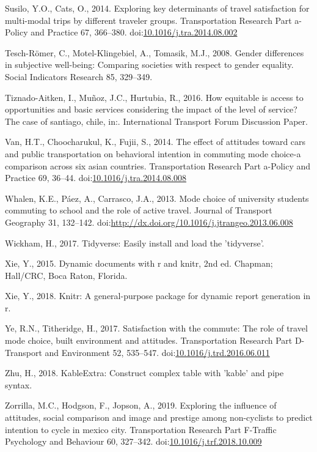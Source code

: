 \documentclass[]{elsarticle} %
\begin{document}
\leavevmode\hypertarget{ref-Susilo2014exploring}{}%
Susilo, Y.O., Cats, O., 2014. Exploring key determinants of travel
satisfaction for multi-modal trips by different traveler groups.
Transportation Research Part a-Policy and Practice 67, 366--380.
doi:\href{https://doi.org/10.1016/j.tra.2014.08.002}{10.1016/j.tra.2014.08.002}

\leavevmode\hypertarget{ref-Tesch2008gender}{}%
Tesch-Römer, C., Motel-Klingebiel, A., Tomasik, M.J., 2008. Gender
differences in subjective well-being: Comparing societies with respect
to gender equality. Social Indicators Research 85, 329--349.

\leavevmode\hypertarget{ref-TiznadoAitken2016}{}%
Tiznado-Aitken, I., Muñoz, J.C., Hurtubia, R., 2016. How equitable is
access to opportunities and basic services considering the impact of the
level of service? The case of santiago, chile, in:. International
Transport Forum Discussion Paper.

\leavevmode\hypertarget{ref-Van2014effect}{}%
Van, H.T., Choocharukul, K., Fujii, S., 2014. The effect of attitudes
toward cars and public transportation on behavioral intention in
commuting mode choice-a comparison across six asian countries.
Transportation Research Part a-Policy and Practice 69, 36--44.
doi:\href{https://doi.org/10.1016/j.tra.2014.08.008}{10.1016/j.tra.2014.08.008}

\leavevmode\hypertarget{ref-Whalen2013mode}{}%
Whalen, K.E., Páez, A., Carrasco, J.A., 2013. Mode choice of university
students commuting to school and the role of active travel. Journal of
Transport Geography 31, 132--142.
doi:\href{https://doi.org/http://dx.doi.org/10.1016/j.jtrangeo.2013.06.008}{http://dx.doi.org/10.1016/j.jtrangeo.2013.06.008}

\leavevmode\hypertarget{ref-Wickham2017}{}%
Wickham, H., 2017. Tidyverse: Easily install and load the 'tidyverse'.

\leavevmode\hypertarget{ref-Xie2015}{}%
Xie, Y., 2015. Dynamic documents with r and knitr, 2nd ed. Chapman;
Hall/CRC, Boca Raton, Florida.

\leavevmode\hypertarget{ref-Xie2018}{}%
Xie, Y., 2018. Knitr: A general-purpose package for dynamic report
generation in r.

\leavevmode\hypertarget{ref-Ye2017satisfaction}{}%
Ye, R.N., Titheridge, H., 2017. Satisfaction with the commute: The role
of travel mode choice, built environment and attitudes. Transportation
Research Part D-Transport and Environment 52, 535--547.
doi:\href{https://doi.org/10.1016/j.trd.2016.06.011}{10.1016/j.trd.2016.06.011}

\leavevmode\hypertarget{ref-Zhu2018}{}%
Zhu, H., 2018. KableExtra: Construct complex table with 'kable' and pipe
syntax.

\leavevmode\hypertarget{ref-Zorrilla2019exploring}{}%
Zorrilla, M.C., Hodgson, F., Jopson, A., 2019. Exploring the influence
of attitudes, social comparison and image and prestige among
non-cyclists to predict intention to cycle in mexico city.
Transportation Research Part F-Traffic Psychology and Behaviour 60,
327--342.
doi:\href{https://doi.org/10.1016/j.trf.2018.10.009}{10.1016/j.trf.2018.10.009}
\end{document}
